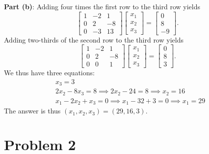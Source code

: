 \documentclass[11pt]{article}
\begin{document}

\textbf{Part (b)}: Adding four times the first row to the third row yields
\[
	\begin{bmatrix} 1 & -2 & 1 \\ 0 & 2 & -8 \\ 0 & -3 & 13 \end{bmatrix} \begin{bmatrix} x_{1} \\ x_{2} \\ x_{3} \end{bmatrix} = \begin{bmatrix} 0 \\ 8 \\ -9 \end{bmatrix}.
\]
Adding two-thirds of the second row to the third row yields
\[
	\begin{bmatrix} 1 & -2 & 1 \\ 0 & 2 & -8 \\ 0 & 0 & 1 \end{bmatrix} \begin{bmatrix} x_{1} \\ x_{2} \\ x_{3} \end{bmatrix} = \begin{bmatrix} 0 \\ 8 \\ 3 \end{bmatrix}.
\]
We thus have three equations:
\begin{align*}
	& x_{3} = 3 \\
	& 2x_{2} - 8x_{3} = 8 \implies 2x_{2} - 24 = 8 \implies x_{2} = 16 \\
	& x_{1} - 2x_{2} + x_{3} = 0 \implies x_{1} - 32 + 3 = 0 \implies x_{1} = 29
\end{align*}
The answer is thus $(x_{1}, x_{2}, x_{3}) = (29, 16, 3)$.


\section{Problem 2}
\end{document}

